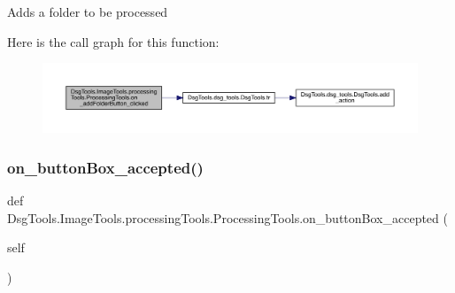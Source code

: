 \begin{DoxyVerb}Adds a folder to be processed
\end{DoxyVerb}
 Here is the call graph for this function\+:
\nopagebreak
\begin{figure}[H]
\begin{center}
\leavevmode
\includegraphics[width=350pt]{class_dsg_tools_1_1_image_tools_1_1processing_tools_1_1_processing_tools_a88953ffad9619128d85cd444564b0b7c_cgraph}
\end{center}
\end{figure}
\mbox{\label{class_dsg_tools_1_1_image_tools_1_1processing_tools_1_1_processing_tools_afd52af3160c2c4221b8cb58b2b8e2ae9}} 
\subsubsection{\texorpdfstring{on\+\_\+button\+Box\+\_\+accepted()}{on\_buttonBox\_accepted()}}
{\footnotesize\ttfamily def Dsg\+Tools.\+Image\+Tools.\+processing\+Tools.\+Processing\+Tools.\+on\+\_\+button\+Box\+\_\+accepted (\begin{DoxyParamCaption}\item[{}]{self }\end{DoxyParamCaption})}

